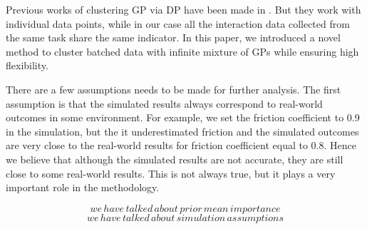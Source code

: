 \documentclass[journal]{IEEEtran}
\begin{document}
Previous works of clustering GP via DP have been made in \cite{infinite_MGP, variational_MGP}. 
But they work with individual data points, while in our case all the interaction data collected from the same task share the same indicator.
In this paper, we introduced a novel method to cluster batched data with infinite mixture of GPs while ensuring high flexibility.


There are a few assumptions needs to be made for further analysis. The first assumption is that the simulated results always correspond to real-world outcomes in some environment. 
For example, we set the friction coefficient to 0.9 in the simulation, but the it underestimated friction and the simulated outcomes are very close to the real-world results for friction coefficient equal to 0.8.
Hence we believe that although the simulated results are not accurate, they are still close to some real-world results.
This is not always true, but it plays a very important role in the methodology.


$$we \, have \, talked \, about \, prior \, mean \, importance$$
$$we \, have \, talked \, about \, simulation \, assumptions$$
\end{document}
